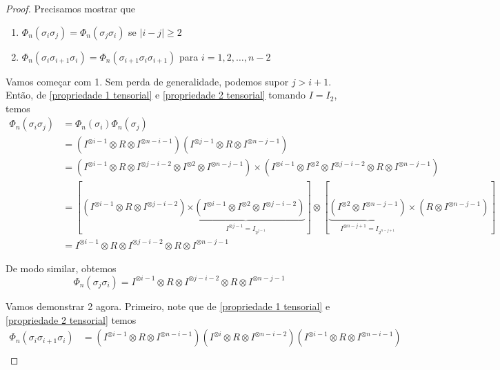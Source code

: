 	\begin{proof}
		Precisamos mostrar que 
		\begin{enumerate}
			\item $\Phi_n(\sigma_i\sigma_j) = \Phi_n(\sigma_j\sigma_i)$ se $|i-j|\geq 2$
			\item $\Phi_n(\sigma_i\sigma_{i+1}\sigma_i) = \Phi_n(\sigma_{i+1}\sigma_i\sigma_{i+1})$ para $i=1,2,\dots, n-2$
		\end{enumerate}
		\par\vspace{0.3cm} Vamos começar com 1. Sem perda de generalidade, podemos supor $j>i+1$. Então, de \eqref{propriedade 1 tensorial} e \eqref{propriedade 2 tensorial} tomando $I = I_2$, temos
		\begin{align*}
		\Phi_n(\sigma_i\sigma_j) &= \Phi_n(\sigma_i)\Phi_n(\sigma_j) \\
		&= (I^{\otimes i-1} \otimes R \otimes I^{\otimes n-i-1})( I^{\otimes j-1} \otimes R \otimes I^{\otimes n-j-1} ) \\
		&= ( I^{\otimes i-1} \otimes R \otimes I^{\otimes j-i-2}\otimes I^{\otimes 2} \otimes I^{\otimes n-j-1}  ) \times (I^{\otimes i-1} \otimes I^{\otimes 2} \otimes I^{\otimes j-i-2} \otimes R \otimes I^{\otimes n-j-1} ) \\
		&=  [(I^{\otimes i-1} \otimes R \otimes I^{\otimes j-i-2})\underbrace{\times(I^{\otimes i-1}\otimes I^{\otimes 2} \otimes I^{\otimes j-i-2})}_{I^{\otimes j-1} = I_{2^{j-1}}}]\otimes [\underbrace{(I^{\otimes 2} \otimes I^{\otimes n-j-1})}_{I^{\otimes n-j+1} = I_{2^{n-j+1}}  }\times(R \otimes I^{\otimes n-j-1})] \\
		&= I^{\otimes i-1} \otimes R \otimes I^{\otimes j-i-2} \otimes R \otimes I^{\otimes n-j-1}
		\end{align*} 
		\par\vspace{0.3cm} De modo similar, obtemos
		\begin{equation*}
		\Phi_n(\sigma_j\sigma_i) = I^{\otimes i-1} \otimes R \otimes I^{\otimes j-i-2} \otimes R \otimes I^{\otimes n-j-1}
		\end{equation*}
		\par\vspace{0.3cm} Vamos demonstrar 2 agora. Primeiro, note que de \eqref{propriedade 1 tensorial} e \eqref{propriedade 2 tensorial} temos
		\begin{align*}
		\Phi_n(\sigma_i\sigma_{i+1}\sigma_i) &= (I^{\otimes i-1} \otimes R \otimes I^{\otimes n-i-1}) (I^{\otimes i} \otimes R \otimes I^{\otimes n-i-2}) (I^{\otimes i-1} \otimes R \otimes I^{\otimes n-i-1}) \\

\end{align*}
\end{proof}

